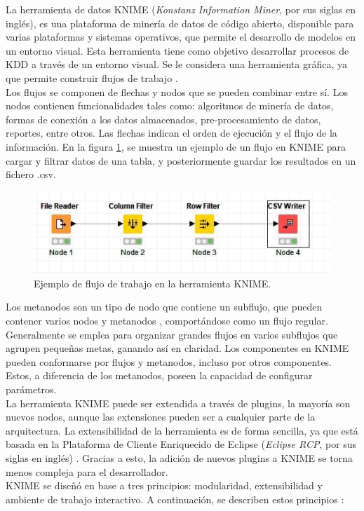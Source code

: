 La herramienta de datos KNIME (\textit{Konstanz Information Miner}, por sus siglas en inglés), es una plataforma de minería de datos de código abierto, disponible para varias plataformas y sistemas operativos, que permite el desarrollo de modelos en un entorno visual. Esta herramienta tiene como objetivo desarrollar procesos de KDD a través de un entorno visual. Se le considera una herramienta gráfica, ya que permite construir flujos de trabajo \citep{knime2023}. \\
Los flujos se componen de flechas y nodos que se pueden combinar entre sí. Los nodos contienen funcionalidades tales como: algoritmos de minería de datos, formas de conexión a los datos almacenados, pre-procesamiento de datos, reportes, entre otros. Las flechas indican el orden de ejecución y el flujo de la información. En la figura \ref{fig:ejemploworkflow}, se muestra un ejemplo de un flujo en KNIME para cargar y filtrar datos de una tabla, y posteriormente guardar los resultados en un fichero .csv. 
\begin{figure}[H]
	\centering
	\includegraphics[width=0.9\linewidth]{figuras/capi 1/ejemplo_workflow}
	\caption{Ejemplo de flujo de trabajo en la herramienta KNIME.}
	\label{fig:ejemploworkflow}
\end{figure}
Los metanodos son un tipo de nodo que contiene un subflujo, que pueden contener varios nodos y metanodos \citep{berthold2009knime}, comportándose como un flujo regular. Generalmente se emplea para organizar grandes flujos en varios subflujos que agrupen pequeñas metas, ganando así en claridad. Los componentes en KNIME pueden conformarse por flujos y metanodos, incluso por otros componentes. Estos, a diferencia de los metanodos, poseen la capacidad de configurar parámetros. \\
La herramienta KNIME puede ser extendida a través de plugins, la mayoría son nuevos nodos, aunque las extensiones pueden ser a cualquier parte de la arquitectura. La extensibilidad de la herramienta es de forma sencilla, ya que está basada en la Plataforma de Cliente Enriquecido de Eclipse (\textit{Eclipse RCP}, por sus siglas en inglés) \citep{berthold2009knime}. Gracias a esto, la adición de nuevos plugins a KNIME se torna menos compleja para el desarrollador. \\
KNIME se diseñó en base a tres principios: modularidad, extensibilidad y ambiente de trabajo interactivo. A continuación, se describen estos principios \citep{Lisandra2012}:

